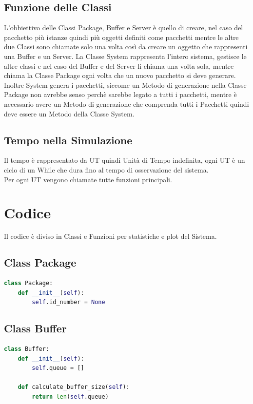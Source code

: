 \documentclass[12pt,a4paper]{article}
\begin{document}
\subsection{Funzione delle Classi}
L'obbiettivo delle Classi Package, Buffer e Server è quello di creare, nel caso del pacchetto più istanze quindi più oggetti definiti come pacchetti mentre le altre due Classi sono chiamate solo una volta così da creare un oggetto che rappresenti una Buffer e un Server.
\bigbreak
La Classe System rappresenta l'intero sistema, gestisce le altre classi e nel caso del Buffer e del Server li chiama una volta sola, mentre chiama la Classe Package ogni volta che un nuovo pacchetto si deve generare. \\
Inoltre System genera i pacchetti, siccome un Metodo di generazione nella Classe Package non avrebbe senso perchè sarebbe legato a tutti i pacchetti, mentre è necessario avere un Metodo di generazione che comprenda tutti i Pacchetti quindi deve essere un Metodo della Classe System.
\subsection{Tempo nella Simulazione}
Il tempo è rappresentato da UT quindi Unità di Tempo indefinita, ogni UT è un ciclo di un While che dura fino al tempo di osservazione del sistema. \\
Per ogni UT vengono chiamate tutte funzioni principali.

\section{Codice}
Il codice è diviso in Classi e Funzioni per statistiche e plot del Sistema.

\subsection{Class Package}
\begin{lstlisting}[language=Python, caption=Class Package]
class Package:
    def __init__(self):
        self.id_number = None
\end{lstlisting}

\subsection{Class Buffer}
\begin{lstlisting}[language=Python, caption=Class Buffer]
class Buffer:
    def __init__(self):
        self.queue = []
    
    def calculate_buffer_size(self):
        return len(self.queue)
\end{lstlisting}
\end{document}
